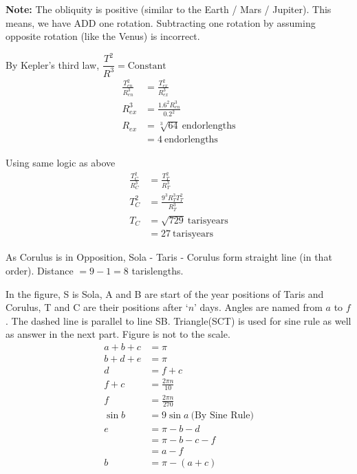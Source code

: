 \begin{description}
  \textbf{Note:} The obliquity is positive (similar to the Earth / Mars /
  Jupiter). This means, we have ADD one rotation. Subtracting one rotation by
  assuming opposite rotation (like the Venus) is incorrect.
\item[(c)] By Kepler's third law, $\dfrac{T^2}{R^3} = \text{Constant}$
  \begin{align*}
  \frac{T_{en}^2}{R_{en}^3} &= \frac{T_{ex}^2}{R_{ex}^3} \tag{1}\\
  R_{ex}^3 &= \frac{1.6^2 R_{en}^3}{0.2^2} \tag{2}\\
  R_{ex} &= \sqrt[3]{64}\ \text{endorlengths} \tag{3}\\
         &= 4\ \text{endorlengths} \tag{4}
  \end{align*}
\item[(d)] Using same logic as above
  \begin{align*}
  \frac{T_C^2}{R_C^3} &= \frac{T_T^2}{R_T^3} \tag{5}\\
  T_C^2 &= \frac{9^3 R_T^3 T_T^2}{R_T^3} \tag{6}\\
  T_C &= \sqrt{729}\ \text{tarisyears} \tag{7}\\
      &= 27\ \text{tarisyears} \tag{8}
  \end{align*}
\item[(e)] As Corulus is in Opposition, Sola - Taris - Corulus form straight
  line (in that order). Distance $= 9 - 1 = 8$ tarislengths.
\item[(f)] In the figure, S is Sola, A and B are start of the year positions
  of Taris and Corulus, T and C are their positions after `$n$' days. Angles
  are named from $a$ to $f$. The dashed line is parallel to line SB.
  Triangle(SCT) is used for sine rule as well as answer in the next part.
  Figure is not to the scale.
  \begin{align*}
  a + b + c &= \pi \tag{9}\\
  b + d + e &= \pi \tag{10}\\
  d &= f + c \tag{11}\\
  f + c &= \frac{2\pi n}{10} \tag{12}\\
  f &= \frac{2\pi n}{270} \tag{13}\\
  \sin b &= 9\sin a \ \text{(By Sine Rule)} \tag{14}\\[6pt]
  e &= \pi - b - d \tag{15}\\
    &= \pi - b - c - f \tag{16}\\
    &= a - f \tag{17}\\[6pt]
  b &= \pi - (a + c) \tag{18}\\

\end{align*}
\end{description}
